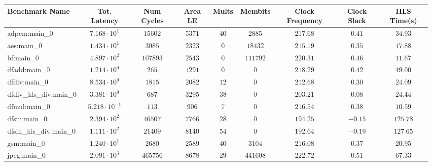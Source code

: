 \begin{tabular}{|l|c|c|c|c|c|c|c|c|}
\hline
Benchmark Name          & Tot. Latency            & Num Cycles & Area LE   & Mults   & Membits    & Clock Frequency & Clock Slack & HLS Time(s) \\
\hline
adpcm:main\_0           & $ 7.168 \cdot 10^{1}  $ & $ 15602  $ & $ 5371  $ & $ 40  $ & $ 2885   $ & $ 217.68      $ & $ 0.41    $ & $ 34.93   $ \\
aes:main\_0             & $ 1.434 \cdot 10^{1}  $ & $ 3085   $ & $ 2323  $ & $ 0   $ & $ 18432  $ & $ 215.19      $ & $ 0.35    $ & $ 17.88   $ \\
bf:main\_0              & $ 4.897 \cdot 10^{2}  $ & $ 107893 $ & $ 2543  $ & $ 0   $ & $ 111792 $ & $ 220.31      $ & $ 0.46    $ & $ 11.67   $ \\
dfadd:main\_0           & $ 1.214 \cdot 10^{0}  $ & $ 265    $ & $ 1291  $ & $ 0   $ & $ 0      $ & $ 218.29      $ & $ 0.42    $ & $ 49.00   $ \\
dfdiv:main\_0           & $ 8.534 \cdot 10^{0}  $ & $ 1815   $ & $ 2082  $ & $ 12  $ & $ 0      $ & $ 212.68      $ & $ 0.30    $ & $ 24.09   $ \\
dfdiv\_hls\_div:main\_0 & $ 3.381 \cdot 10^{0}  $ & $ 687    $ & $ 3295  $ & $ 38  $ & $ 0      $ & $ 203.21      $ & $ 0.08    $ & $ 24.44   $ \\
dfmul:main\_0           & $ 5.218 \cdot 10^{-1} $ & $ 113    $ & $ 906   $ & $ 7   $ & $ 0      $ & $ 216.54      $ & $ 0.38    $ & $ 10.59   $ \\
dfsin:main\_0           & $ 2.394 \cdot 10^{2}  $ & $ 46507  $ & $ 7766  $ & $ 28  $ & $ 0      $ & $ 194.25      $ & $ -0.15   $ & $ 125.78  $ \\
dfsin\_hls\_div:main\_0 & $ 1.111 \cdot 10^{2}  $ & $ 21409  $ & $ 8140  $ & $ 54  $ & $ 0      $ & $ 192.64      $ & $ -0.19   $ & $ 127.65  $ \\
gsm:main\_0             & $ 1.240 \cdot 10^{1}  $ & $ 2680   $ & $ 2589  $ & $ 40  $ & $ 3104   $ & $ 216.08      $ & $ 0.37    $ & $ 20.95   $ \\
jpeg:main\_0            & $ 2.091 \cdot 10^{3}  $ & $ 465756 $ & $ 8678  $ & $ 29  $ & $ 441608 $ & $ 222.72      $ & $ 0.51    $ & $ 67.33   $ \\

\end{tabular}
